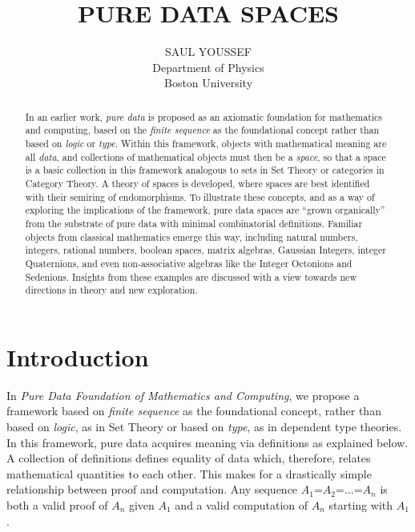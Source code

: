 \documentclass[11pt]{article}
\begin{document}
\title{\bf {PURE DATA SPACES}}
\author{%
  SAUL YOUSSEF%
  \hfil \\
  Department of Physics \\
  Boston University \\
}
\maketitle
\begin{abstract}
In an earlier work, {\it pure data} is proposed as an axiomatic foundation for mathematics and computing, based on the {\it finite sequence} as 
the foundational concept rather than based on {\it logic} or {\it type}.   Within this framework, objects with mathematical meaning are 
all {\it data}, and collections of mathematical objects must then be a {\it space}, so that a space is a basic collection in this 
framework analogous to sets in Set Theory or categories in Category Theory.  A theory of spaces is developed, where 
spaces are best identified with their semiring of endomorphisms.  To illustrate these concepts, and as a way of 
exploring the implications of the framework, pure data spaces are ``grown organically'' from the substrate of 
pure data with minimal combinatorial definitions.  Familiar objects from classical mathematics emerge this way,   
including natural numbers, integers, rational numbers, boolean spaces, matrix algebras, Gaussian Integers, 
integer Quaternions, and even non-associative algebras like the Integer Octonions and Sedenions. 
Insights from these examples are discussed with a view towards new directions in theory and new exploration.
\end{abstract}

\theoremstyle{definition}
\newtheorem{axiom}{Axiom}
\newtheorem*{axiom*}{Axiom}
\newtheorem*{fact}{Fact}
\newtheorem{theorem}{Theorem}[section]
\newtheorem{lemma}{Lemma}
\newtheorem{corollary}[theorem]{Corollary}

\newtheorem{definition}{Definition}

\newtheorem*{remark}{}

\section{Introduction}

    In {\it Pure Data Foundation of Mathematics and Computing}\cite{PDF}, we propose a framework based on {\it finite sequence} as the foundational concept, rather than based on {\it logic}, as in Set Theory or 
based on {\it type}, as in dependent type theories.  In this framework, pure data acquires meaning via definitions as 
explained below.  A collection of definitions defines equality of data which, therefore, relates mathematical quantities to 
each other.  This makes for a drastically simple relationship between proof and computation.   
Any sequence $A_1$=$A_2$=$\dots$=$A_n$ is both a valid proof of $A_n$ given $A_1$ and a valid computation 
of $A_n$ starting with $A_1$.  
\end{document}
